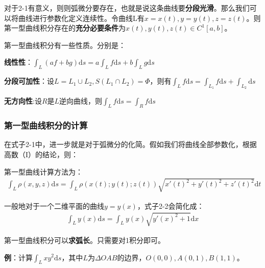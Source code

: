 \documentclass{ctexart}
\let\oldtextbf\textbf
\renewcommand{\textbf}[1]{\textcolor{brown!50!red}{\oldtextbf{#1}}}
\begin{document}
对于2-1有意义，则则弧微分要存在，也就是说这条曲线要\textbf{\color{brown!50!red}分段光滑}。那么我们可以将曲线进行参数化定义连续性。令曲线L有$x=x(t),y=y(t),z=z(t)$。则第一型曲线积分存在的\textbf{\color{brown!50!red}充分必要条件}为$x(t),y(t),z(t)\in C^1[a,b]$。
\begin{tcolorbox}[
    colback=bac2,     %
    colframe=fra2,   %
    coltitle=white,             %
    coltext=tex2,
    title=第一型曲线积分的性质,
    fonttitle=\bfseries,        %
arc=3mm,                     %
breakable
]
第一型曲线积分有一些性质。分别是：

\textbf{\color{brown!50!red}线性性}：$\int_L(af+bg)\mathrm{d}s=a\int_Lf\mathrm{d}s+b\int_Lg\mathrm{d}s$

\textbf{\color{brown!50!red}分段可加性}：设$L=L_1\cup L_2,S(L_1\cap L_2)=\Phi $，则有$\int_L f\mathrm{d}s=\int_{L_1}f\mathrm{d}s+\int_{L_2}\mathrm{d}s$

\textbf{\color{brown!50!red}无方向性}:设$R$是$L$逆向曲线，则$\int_L f\mathrm{d}s=\int_R f\mathrm{d}s$
\end{tcolorbox}

\subsubsection{第一型曲线积分的计算}
在式子2-1中，进一步就是对于弧微分的化简。假如我们将曲线全部参数化，根据高数（I）的结论，则：
\begin{tcolorbox}[
    colback=bac1,     %
    colframe=fra1,   %
    coltitle=white,             %
    coltext=tex1,
    title=第一型曲线积分的计算,
    fonttitle=\bfseries,        %
arc=3mm,                     %
breakable
]
第一型曲线计算方法为：
\begin{align*} 
\int_L\rho(x,y,z)\mathrm{d}s=\int_L\rho(x(t);y(t);z(t))\sqrt{x'(t)^2+y'(t)^2+z'(t)^2}\mathrm{d}t
\tag{2-2}  
\end{align*}

一般地对于一个二维平面的曲线$y=y(x)$，式子2-2会简化成：
\begin{align*} 
\int_Ly(x)\mathrm{d}s=\int_Ly(x)\sqrt{y'(x)^2+1}\mathrm{d}x
\tag{2-3} 
\end{align*}
\end{tcolorbox}

第一型曲线积分可以\textbf{\color{brown!50!red}求弧长}。只需要对1积分即可。

\textbf{\color{brown!50!red}例}：计算$\int_L xy^2\mathrm{d}s$，其中$L$为$\Delta OAB$的边界，$O(0,0),A(0,1),B(1,1)$。
\end{document}
